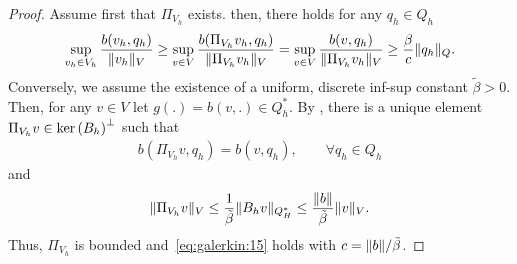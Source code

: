 \begin{proof}
  Assume first that $\Pi_{V_h}$ exists. then, there holds for any
  $q_h\in Q_h$
  \begin{gather*}
    \sup_{v_h\in V_h} \frac{b(v_h, q_h)}{\lVert v_h\rVert_V}
    \ge
    \sup_{v\in V} \frac{b(\Pi_{V_h}v_h, q_h)}{\lVert\Pi_{V_h} v_h\rVert_V}
    =
    \sup_{v\in V} \frac{b(v, q_h)}{\lVert\Pi_{V_h} v_h\rVert_V}
    \ge \frac{\beta}{c} \lVert q_h\rVert_Q.
  \end{gather*}
  Conversely, we assume the existence of a uniform, discrete inf-sup
  constant $\tilde\beta>0$. Then, for any $v\in V$ let
  $g(.) = b(v,.) \in Q_h^*$. By
  , there is a unique
  element $\Pi_{V_h} v \in \operatorname{ker}\left(B_h\right)^\perp$ such that
  \begin{gather*}
    b(\Pi_{V_h}v,q_h) = b(v, q_h),\qquad\forall q_h\in Q_h
  \end{gather*}
  and
  \begin{gather*}
    \lVert\Pi_{V_h}v\rVert_V
    \le \frac1{\tilde\beta}\lVert B_h v\rVert_{Q_H^*}
    \le \frac{\lVert b\rVert}{\tilde\beta} \lVert v\rVert_V.
  \end{gather*}
  Thus, $\Pi_{V_h}$ is bounded and~\eqref{eq:galerkin:15} holds with
  $c=\lVert b\rVert/\tilde\beta$.
\end{proof}

